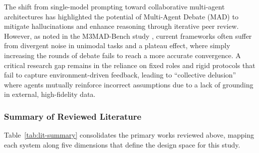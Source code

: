 \documentclass{article}
\begin{document}
The shift from single-model prompting toward collaborative multi-agent architectures has highlighted the potential of Multi-Agent Debate (MAD) to mitigate hallucinations and enhance reasoning through iterative peer review. However, as noted in the M3MAD-Bench study \cite{li2026m3mad}, current frameworks often suffer from divergent noise in unimodal tasks and a plateau effect, where simply increasing the rounds of debate fails to reach a more accurate convergence. A critical research gap remains in the reliance on fixed roles and rigid protocols that fail to capture environment-driven feedback, leading to ``collective delusion'' where agents mutually reinforce incorrect assumptions due to a lack of grounding in external, high-fidelity data.

\subsubsection*{Summary of Reviewed Literature}

Table~\ref{tab:lit-summary} consolidates the primary works reviewed above, mapping each system along five dimensions that define the design space for this study.
\end{document}
